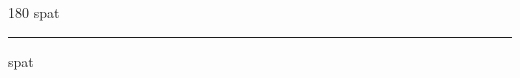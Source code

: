 
\begin{frame}
\begin{center}
\begin{turn}{180}
{\fontsize{2.5cm}{1em}\selectfont spat}
\end{turn}
\vspace{1em}\par  
\hrule
\vspace{1em}\par  
{\fontsize{2.5cm}{1em}\selectfont spat}
\end{center}
\end{frame}
